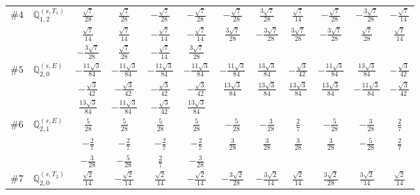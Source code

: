 \documentclass[fleqn,9pt,landscape]{jsarticle}
\begin{document}
\begin{center}
\begin{longtable}{lcccccccccc}
$ \#4\quad \mathbb{Q}_{1,2}^{(s,T_{1})} $ & $ \frac{\sqrt{7}}{28} $ & $ \frac{\sqrt{7}}{28} $ & $ - \frac{\sqrt{7}}{28} $ & $ - \frac{\sqrt{7}}{28} $ & $ - \frac{\sqrt{7}}{28} $ & $ \frac{3 \sqrt{7}}{28} $ & $ \frac{\sqrt{7}}{14} $ & $ - \frac{\sqrt{7}}{28} $ & $ - \frac{3 \sqrt{7}}{28} $ & $ - \frac{\sqrt{7}}{14} $ \\
& $ \frac{\sqrt{7}}{14} $ & $ \frac{\sqrt{7}}{14} $ & $ - \frac{\sqrt{7}}{14} $ & $ - \frac{\sqrt{7}}{14} $ & $ \frac{3 \sqrt{7}}{28} $ & $ - \frac{3 \sqrt{7}}{28} $ & $ \frac{3 \sqrt{7}}{28} $ & $ - \frac{3 \sqrt{7}}{28} $ & $ \frac{\sqrt{7}}{28} $ & $ \frac{\sqrt{7}}{14} $ \\
& $ - \frac{3 \sqrt{7}}{28} $ & $ \frac{\sqrt{7}}{28} $ & $ - \frac{\sqrt{7}}{14} $ & $ \frac{3 \sqrt{7}}{28} $ & $  $ & $  $ & $  $ & $  $ & $  $ & $  $ \\ \hline
$ \#5\quad \mathbb{Q}_{2,0}^{(s,E)} $ & $ - \frac{11 \sqrt{3}}{84} $ & $ - \frac{11 \sqrt{3}}{84} $ & $ - \frac{11 \sqrt{3}}{84} $ & $ - \frac{11 \sqrt{3}}{84} $ & $ - \frac{11 \sqrt{3}}{84} $ & $ \frac{13 \sqrt{3}}{84} $ & $ - \frac{\sqrt{3}}{42} $ & $ - \frac{11 \sqrt{3}}{84} $ & $ \frac{13 \sqrt{3}}{84} $ & $ - \frac{\sqrt{3}}{42} $ \\
& $ - \frac{\sqrt{3}}{42} $ & $ - \frac{\sqrt{3}}{42} $ & $ - \frac{\sqrt{3}}{42} $ & $ - \frac{\sqrt{3}}{42} $ & $ \frac{13 \sqrt{3}}{84} $ & $ \frac{13 \sqrt{3}}{84} $ & $ \frac{13 \sqrt{3}}{84} $ & $ \frac{13 \sqrt{3}}{84} $ & $ - \frac{11 \sqrt{3}}{84} $ & $ - \frac{\sqrt{3}}{42} $ \\
& $ \frac{13 \sqrt{3}}{84} $ & $ - \frac{11 \sqrt{3}}{84} $ & $ - \frac{\sqrt{3}}{42} $ & $ \frac{13 \sqrt{3}}{84} $ & $  $ & $  $ & $  $ & $  $ & $  $ & $  $ \\ \hline
$ \#6\quad \mathbb{Q}_{2,1}^{(s,E)} $ & $ \frac{5}{28} $ & $ \frac{5}{28} $ & $ \frac{5}{28} $ & $ \frac{5}{28} $ & $ - \frac{5}{28} $ & $ - \frac{3}{28} $ & $ \frac{2}{7} $ & $ - \frac{5}{28} $ & $ - \frac{3}{28} $ & $ \frac{2}{7} $ \\
& $ - \frac{2}{7} $ & $ - \frac{2}{7} $ & $ - \frac{2}{7} $ & $ - \frac{2}{7} $ & $ \frac{3}{28} $ & $ \frac{3}{28} $ & $ \frac{3}{28} $ & $ \frac{3}{28} $ & $ - \frac{5}{28} $ & $ \frac{2}{7} $ \\
& $ - \frac{3}{28} $ & $ - \frac{5}{28} $ & $ \frac{2}{7} $ & $ - \frac{3}{28} $ & $  $ & $  $ & $  $ & $  $ & $  $ & $  $ \\ \hline
$ \#7\quad \mathbb{Q}_{2,0}^{(s,T_{2})} $ & $ \frac{\sqrt{2}}{14} $ & $ - \frac{\sqrt{2}}{14} $ & $ \frac{\sqrt{2}}{14} $ & $ - \frac{\sqrt{2}}{14} $ & $ - \frac{3 \sqrt{2}}{28} $ & $ - \frac{3 \sqrt{2}}{14} $ & $ \frac{\sqrt{2}}{14} $ & $ \frac{3 \sqrt{2}}{28} $ & $ \frac{3 \sqrt{2}}{14} $ & $ \frac{\sqrt{2}}{14} $ \\

\end{longtable}
\end{center}
\end{document}
